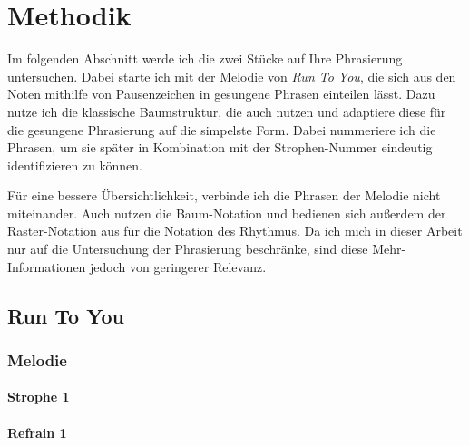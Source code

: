 \chapter{Methodik}
\label{chap:Methodik}
\pagestyle{plain}

Im folgenden Abschnitt werde ich die zwei Stücke auf Ihre Phrasierung untersuchen. Dabei starte ich mit der Melodie von \textit{Run To You}, die sich aus den Noten mithilfe von Pausenzeichen in gesungene Phrasen einteilen lässt. Dazu nutze ich die klassische Baumstruktur, die auch \cite{lerdahl1983generative} nutzen und adaptiere diese für die gesungene Phrasierung auf die simpelste Form. Dabei nummeriere ich die Phrasen, um sie später in Kombination mit der Strophen-Nummer eindeutig identifizieren zu können. 

Für eine bessere Übersichtlichkeit, verbinde ich die Phrasen der Melodie nicht miteinander. Auch \cite{hayes1996role} nutzen die Baum-Notation und bedienen sich außerdem der Raster-Notation aus \cite{liberman1975intonational} für die Notation des Rhythmus. Da ich mich in dieser Arbeit nur auf die Untersuchung der Phrasierung beschränke, sind diese Mehr-Informationen jedoch von geringerer Relevanz.

\tiny 

\section*{Run To You}

\subsection*{Melodie}


\subsubsection*{Strophe 1}


\subsubsection*{Refrain 1}

